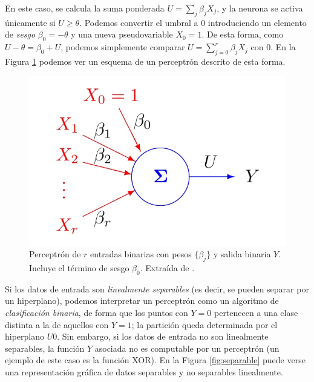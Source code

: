 \documentclass[
  a4paper,
  12pt,
  spanish,
]{scrartcl}
\theoremstyle{teorema-style}
\begin{document}
En este caso, se calcula la suma ponderada $U=\sum_j \beta_j X_j$, y la neurona se activa únicamente si $U\ge \theta$. Podemos convertir el umbral a $0$ introduciendo un elemento de \textit{sesgo} $\beta_0 = -\theta$ y una nueva pseudovariable $X_0 = 1$. De esta forma, como $U-\theta = \beta_0 + U$, podemos simplemente comparar $U=\sum_{j=0}^r \beta_j X_j$ con $0$. En la Figura \ref{fig:perceptron} podemos ver un esquema de un perceptrón descrito de esta forma.

\begin{figure}[h]
  \centering
  \includegraphics[width=.7\textwidth]{img/perceptron}
  \caption{Perceptrón de $r$ entradas binarias con pesos $\{\beta_j\}$ y salida binaria $Y$. Incluye el término de sesgo $\beta_0$. Extraída de \parencite{izenman_modern_2008}.}
  \label{fig:perceptron}
\end{figure}

Si los datos de entrada son \textit{linealmente separables} (es decir, se pueden separar por un hiperplano), podemos interpretar un perceptrón como un algoritmo de \textit{clasificación binaria}, de forma que los puntos con $Y=0$ pertenecen a una clase distinta a la de aquellos con $Y=1$; la partición queda determinada por el hiperplano $U0$. Sin embargo, si los datos de entrada no son linealmente separables, la función $Y$ asociada no es computable por un perceptrón (un ejemplo de este caso es la función XOR). En la Figura \ref{fig:separable} puede verse una representación gráfica de datos separables y no separables linealmente.
\end{document}
